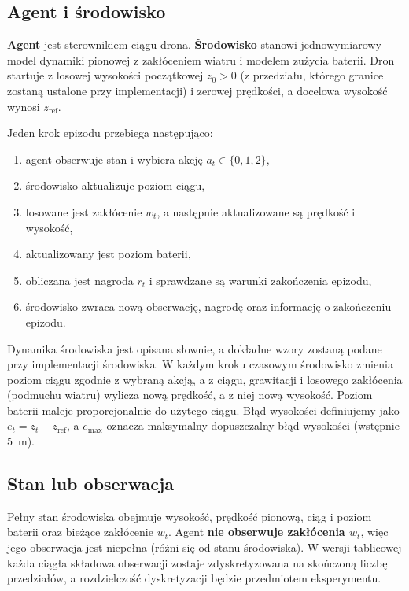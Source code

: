 \documentclass[12pt]{article}
\begin{document}
\subsection{Agent i środowisko}

\textbf{Agent} jest sterownikiem ciągu drona. \textbf{Środowisko} stanowi jednowymiarowy model dynamiki pionowej z zakłóceniem wiatru i modelem zużycia baterii. Dron startuje z losowej wysokości początkowej $z_0 > 0$ (z przedziału, którego granice zostaną ustalone przy implementacji) i zerowej prędkości, a docelowa wysokość wynosi $z_{\mathrm{ref}}$.

Jeden krok epizodu przebiega następująco:
\begin{enumerate}
    \item agent obserwuje stan i wybiera akcję $a_t \in \{0, 1, 2\}$,
    \item środowisko aktualizuje poziom ciągu,
    \item losowane jest zakłócenie $w_t$, a następnie aktualizowane są prędkość i wysokość,
    \item aktualizowany jest poziom baterii,
    \item obliczana jest nagroda $r_t$ i sprawdzane są warunki zakończenia epizodu,
    \item środowisko zwraca nową obserwację, nagrodę oraz informację o zakończeniu epizodu.
\end{enumerate}

Dynamika środowiska jest opisana słownie, a dokładne wzory zostaną podane przy implementacji środowiska. W każdym kroku czasowym środowisko zmienia poziom ciągu zgodnie z wybraną akcją, a z ciągu, grawitacji i losowego zakłócenia (podmuchu wiatru) wylicza nową prędkość, a z niej nową wysokość. Poziom baterii maleje proporcjonalnie do użytego ciągu. Błąd wysokości definiujemy jako $e_t = z_t - z_{\mathrm{ref}}$, a $e_{\max}$ oznacza maksymalny dopuszczalny błąd wysokości (wstępnie 5~m).

\subsection{Stan lub obserwacja}

Pełny stan środowiska obejmuje wysokość, prędkość pionową, ciąg i poziom baterii oraz bieżące zakłócenie $w_t$. Agent \textbf{nie obserwuje zakłócenia $w_t$}, więc jego obserwacja jest niepełna (różni się od stanu środowiska). W wersji tablicowej każda ciągła składowa obserwacji zostaje zdyskretyzowana na skończoną liczbę przedziałów, a rozdzielczość dyskretyzacji będzie przedmiotem eksperymentu.
\end{document}
